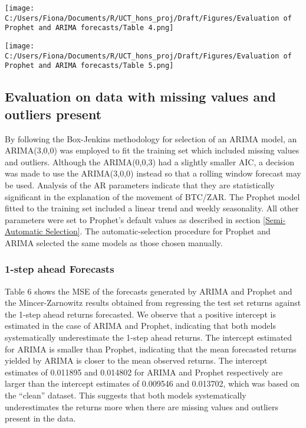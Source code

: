 \documentclass[12pt,a4paper]{article}
\numberwithin{equation}{section}
\numberwithin{figure}{section}
\numberwithin{table}{section}
\let\origfigure\figure
\let\endorigfigure\endfigure
\renewenvironment{figure}[1][2] {
    \expandafter\origfigure\expandafter[H]
} {
    \endorigfigure
}
\begin{document}
\begin{figure}[htbp]
\centering
\texttt{[image: C:/Users/Fiona/Documents/R/UCT\_hons\_proj/Draft/Figures/Evaluation of Prophet and ARIMA forecasts/Table 4.png]}
\caption{Mincer-Zarnowitz results for all forecast horizons}
\end{figure}

\begin{figure}[htbp]
\centering
\texttt{[image: C:/Users/Fiona/Documents/R/UCT\_hons\_proj/Draft/Figures/Evaluation of Prophet and ARIMA forecasts/Table 5.png]}
\caption{MSE for all forecast horizons}
\end{figure}

\subsection{Evaluation on data with missing values and outliers
present}\label{evaluation-on-data-with-missing-values-and-outliers-present}

By following the Box-Jenkins methodology for selection of an ARIMA
model, an ARIMA(3,0,0) was employed to fit the training set which
included missing values and outliers. Although the ARIMA(0,0,3) had a
slightly smaller AIC, a decision was made to use the ARIMA(3,0,0)
instead so that a rolling window forecast may be used. Analysis of the
AR parameters indicate that they are statistically significant in the
explanation of the movement of BTC/ZAR. The Prophet model fitted to the
training set included a linear trend and weekly seasonality. All other
parameters were set to Prophet's default values as described in section
\ref{Semi-Automatic Selection}. The automatic-selection procedure for
Prophet and ARIMA selected the same models as those chosen manually.

\subsubsection{1-step ahead Forecasts}\label{step-ahead-forecasts-1}

Table 6 shows the MSE of the forecasts generated by ARIMA and Prophet
and the Mincer-Zarnowitz results obtained from regressing the test set
returns against the 1-step ahead returns forecasted. We observe that a
positive intercept is estimated in the case of ARIMA and Prophet,
indicating that both models systematically underestimate the 1-step
ahead returns. The intercept estimated for ARIMA is smaller than
Prophet, indicating that the mean forecasted returns yielded by ARIMA is
closer to the mean observed returns. The intercept estimates of 0.011895
and 0.014802 for ARIMA and Prophet respectively are larger than the
intercept estimates of 0.009546 and 0.013702, which was based on the
``clean'' dataset. This suggests that both models systematically
underestimates the returns more when there are missing values and
outliers present in the data.
\end{document}
